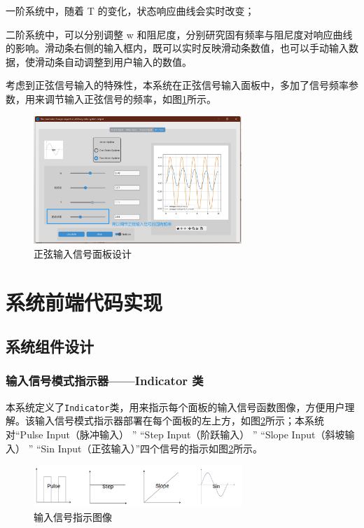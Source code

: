 \documentclass[12pt]{ctexart}
\begin{document}
一阶系统中，随着 T 的变化，状态响应曲线会实时改变；

二阶系统中，可以分别调整 w 和阻尼度，分别研究固有频率与阻尼度对响应曲线的影响。滑动条右侧的输入框内，既可以实时反映滑动条数值，也可以手动输入数据，使滑动条自动调整到用户输入的数值。

考虑到正弦信号输入的特殊性，本系统在正弦信号输入面板中，多加了信号频率参数，用来调节输入正弦信号的频率，如图\ref{figure9}所示。

\begin{figure}[htbp]
    \centering
    \includegraphics[width=0.7\textwidth]{img/sin_tab.png}
    \caption{正弦输入信号面板设计}\label{figure9}
\end{figure}

\section{系统前端代码实现}

\subsection{系统组件设计}

\subsubsection{输入信号模式指示器——Indicator 类}

本系统定义了\texttt{Indicator}类，用来指示每个面板的输入信号函数图像，方便用户理解。该输入信号模式指示器部署在每个面板的左上方，如图\ref{figure10}所示；本系统对“Pulse Input（脉冲输入） ” “Step Input（阶跃输入） ” “Slope Input（斜坡输入） ” “Sin Input（正弦输入）”四个信号的指示如图\ref{figure10}所示。

\begin{figure}[htbp]
    \centering
    \includegraphics[width=0.7\textwidth]{img/input_indicator_img.png}
    \caption{输入信号指示图像}\label{figure10}
\end{figure}
\end{document}
